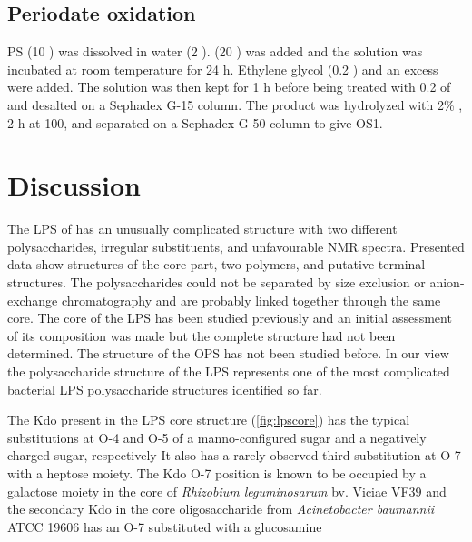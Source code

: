 	\subsection{Periodate oxidation} %
	\label{sub:periodate_oxidation}

		 \ac{PS} (10 \milligram) was dissolved in water (2 \millilitre).  (20 \milligram) was added and the solution was incubated at room temperature for 24 h. Ethylene glycol (0.2 \millilitre) and an excess  were added. The solution was then kept for 1 h before being treated with 0.2 \millilitre of  and desalted on a Sephadex G-15 column. The product was hydrolyzed with 2\% , 2 h at 100\cel, and  separated on a Sephadex G-50 column to give \ac{OS}1.

\section{Discussion} %
\label{sec:discussion}

	The \ac{LPS} of \caulobacter has an unusually complicated structure with two different polysaccharides, irregular substituents, and unfavourable \ac{NMR} spectra. Presented data show structures of the core part, two polymers, and putative terminal structures. The polysaccharides could not be separated by size exclusion or anion-exchange chromatography and are probably linked together through the same core. The core of the \caulobacter{} \ac{LPS} has been studied previously and an initial assessment of its composition was made but the complete structure had not been determined. The structure of the \ac{OPS} has not been studied before. In our view the polysaccharide structure of the \caulobacter{} \ac{LPS} represents one of the most complicated bacterial \ac{LPS} polysaccharide structures identified so far.

	The Kdo present in the \ac{LPS} core structure (\cref{fig:lpscore}) has the typical substitutions at O-4 and O-5 of a manno-configured sugar and a negatively charged sugar, respectively It also has a rarely observed third substitution at O-7 with a heptose moiety. The Kdo O-7 position is known to be occupied by a galactose moiety in the core of \textit{Rhizobium leguminosarum} bv. Viciae VF39 and the secondary Kdo in the core oligosaccharide from \textit{Acinetobacter baumannii} ATCC 19606 has an O-7 substituted with a glucosamine

